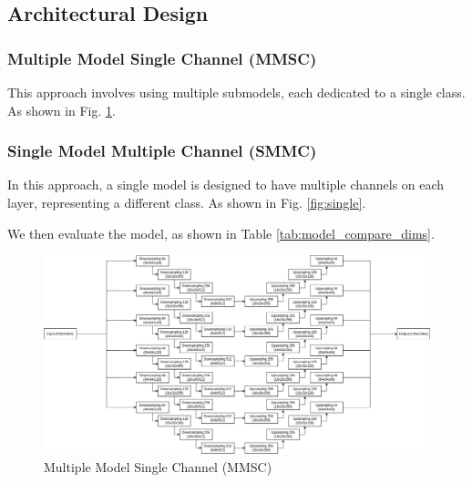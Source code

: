 \documentclass[conference]{IEEEtran}
\begin{document}
\subsection{Architectural Design}
\subsubsection{Multiple Model Single Channel (MMSC)}
This approach involves using multiple submodels, each dedicated to a single class. As shown in Fig. \ref{fig:multiple}.

\subsubsection{Single Model Multiple Channel (SMMC)}
In this approach, a single model is designed to have multiple channels on each layer, representing a different class. As shown in Fig. \ref{fig:single}.

We then evaluate the model, as shown in Table \ref{tab:model_compare_dims}.

\begin{figure}[t!]
    \centering
    \includegraphics[width=\textwidth]{multiple_model.png} %
    \caption{Multiple Model Single Channel (MMSC)}
    \label{fig:multiple}
\end{figure}
\end{document}
